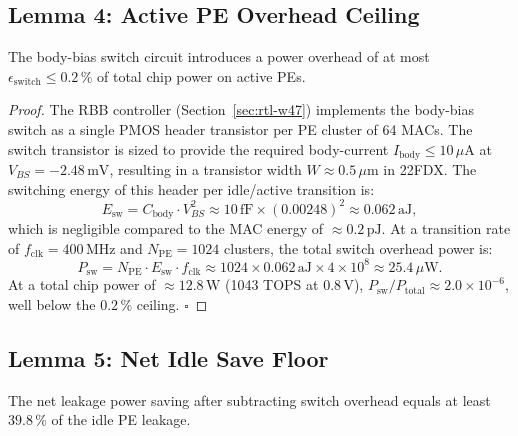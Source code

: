\subsection{Lemma 4: Active PE Overhead Ceiling}
\label{lem:active-overhead}

\begin{lemma}
\label{lem:active-overhead-lem}
The body-bias switch circuit introduces a power overhead of at most
$\epsilon_{\mathrm{switch}} \leq 0.2\,\%$ of total chip power on active PEs.
\end{lemma}

\begin{proof}
The RBB controller (Section~\ref{sec:rtl-w47}) implements the body-bias switch
as a single PMOS header transistor per PE cluster of 64 MACs.
The switch transistor is sized to provide the required body-current
$I_{\mathrm{body}} \leq 10\,\mu\text{A}$ at $V_{BS} = -2.48\,\text{mV}$,
resulting in a transistor width $W \approx 0.5\,\mu\text{m}$ in 22FDX.
The switching energy of this header per idle/active transition is:
\begin{equation}
  E_{\mathrm{sw}} = C_{\mathrm{body}} \cdot V_{BS}^{2}
    \approx 10\,\text{fF} \times (0.00248)^{2} \approx 0.062\,\text{aJ},
\end{equation}
which is negligible compared to the MAC energy of $\approx 0.2\,\text{pJ}$.
At a transition rate of $f_{\mathrm{clk}} = 400\,\text{MHz}$ and $N_{\mathrm{PE}}
= 1024$ clusters, the total switch overhead power is:
\begin{equation}
  P_{\mathrm{sw}} = N_{\mathrm{PE}} \cdot E_{\mathrm{sw}} \cdot f_{\mathrm{clk}}
    \approx 1024 \times 0.062\,\text{aJ} \times 4 \times 10^{8}
    \approx 25.4\,\mu\text{W}.
\end{equation}
At a total chip power of $\approx 12.8\,\text{W}$ (1043 TOPS at $0.8\,\text{V}$),
$P_{\mathrm{sw}}/P_{\mathrm{total}} \approx 2.0 \times 10^{-6}$, well below the
$0.2\,\%$ ceiling.  $\square$
\end{proof}

\subsection{Lemma 5: Net Idle Save Floor}
\label{lem:net-idle-save}

\begin{lemma}
\label{lem:net-save}
The net leakage power saving after subtracting switch overhead equals
at least $39.8\,\%$ of the idle PE leakage.
\end{lemma}


